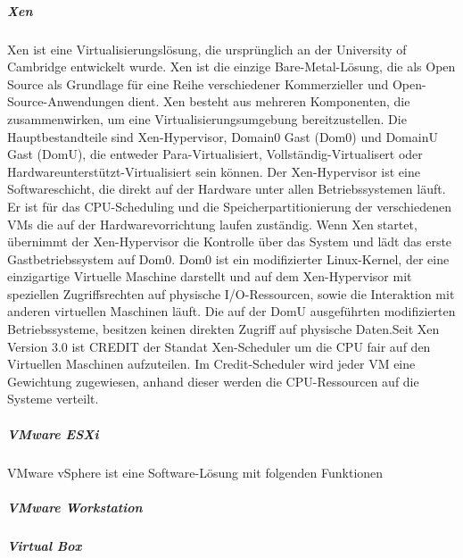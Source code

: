 \subparagraph {Xen}
Xen ist eine Virtualisierungslösung, die ursprünglich an der University of Cambridge entwickelt wurde. Xen ist die einzige Bare-Metal-Lösung, die als Open Source als Grundlage für eine Reihe verschiedener Kommerzieller und Open-Source-Anwendungen dient. Xen besteht aus mehreren Komponenten, die zusammenwirken, um eine Virtualisierungsumgebung bereitzustellen. Die Hauptbestandteile sind Xen-Hypervisor, Domain0 Gast (Dom0) und DomainU Gast (DomU), die entweder Para-Virtualisiert, Vollständig-Virtualisert oder Hardwareunterstützt-Virtualisiert sein können. Der Xen-Hypervisor ist eine Softwareschicht, die direkt auf der Hardware unter allen Betriebssystemen läuft. Er ist für das CPU-Scheduling und die Speicherpartitionierung der verschiedenen VMs die auf der Hardwarevorrichtung laufen zuständig. Wenn Xen startet, übernimmt der Xen-Hypervisor die Kontrolle über das System und lädt das erste Gastbetriebssystem auf Dom0. Dom0 ist ein modifizierter Linux-Kernel, der eine einzigartige Virtuelle Maschine darstellt und auf dem Xen-Hypervisor mit speziellen Zugriffsrechten auf physische I/O-Ressourcen, sowie die Interaktion mit anderen virtuellen Maschinen läuft. Die auf der DomU ausgeführten modifizierten Betriebssysteme, besitzen keinen direkten Zugriff auf physische Daten.Seit Xen Version 3.0 ist CREDIT der Standat Xen-Scheduler um die CPU fair auf den Virtuellen Maschinen aufzuteilen. Im Credit-Scheduler wird jeder VM eine Gewichtung zugewiesen, anhand dieser werden die CPU-Ressourcen auf die Systeme verteilt\cite{Fayyad-Kazan2013BenchmarkingHypervisors}. 

\subparagraph {VMware ESXi \cite{Fayyad-Kazan2013BenchmarkingHypervisors}}
VMware vSphere ist eine Software-Lösung mit folgenden Funktionen


\subparagraph {VMware Workstation}
\subparagraph{Virtual Box}


